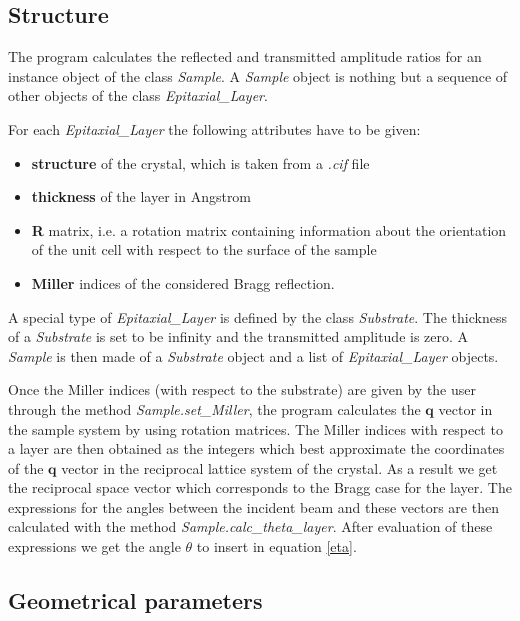 \documentclass[12pt,oneside,notitlepage,abstracton,a4paper]{scrartcl}
\begin{document}

\subsection{Structure}
The program calculates the reflected and transmitted amplitude ratios for an instance object of the class \textit{Sample}. A \textit{Sample} object is nothing but a sequence of other objects of the class \textit{Epitaxial\_Layer}.

For each \textit{Epitaxial\_Layer} the following attributes have to be given:
\begin{itemize}
 \item \textbf{structure} of the crystal, which is taken from a \textit{.cif} file
 \item \textbf{thickness} of the layer in Angstrom
 \item \textbf{R} matrix, i.e. a rotation matrix containing information about the orientation of the unit cell with respect to the surface of the sample
 \item \textbf{Miller} indices of the considered Bragg reflection.
\end{itemize}

A special type of \textit{Epitaxial\_Layer} is defined by the class \textit{Substrate}. The thickness of a \textit{Substrate} is set to be infinity and the transmitted amplitude is zero. A \textit{Sample} is then made of a \textit{Substrate} object and a list of \textit{Epitaxial\_Layer} objects.

Once the Miller indices (with respect to the substrate) are given by the user through the method \textit{Sample.set\_Miller}, the program calculates the $\mathbf{q}$ vector in the sample system by using rotation matrices. The Miller indices with respect to a layer are then obtained as the integers which best approximate the coordinates of the $\mathbf{q}$ vector in the reciprocal lattice system of the crystal. As a result we get the reciprocal space vector which corresponds to the Bragg case for the layer. The expressions for the angles between the incident beam and these vectors are then calculated with the method \textit{Sample.calc\_theta\_layer}. After evaluation of these expressions we get the angle $\theta$ to insert in equation \ref{eta}.


\subsection{Geometrical parameters}\label{geom}
\end{document}
